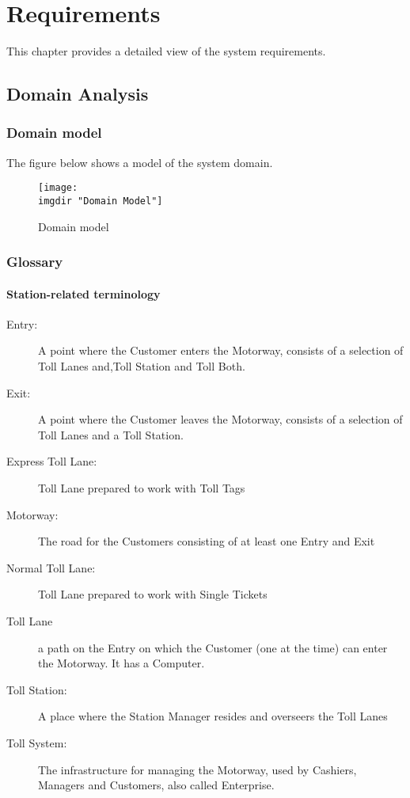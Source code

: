 \chapter{Requirements}
\noindent
This chapter provides a detailed view of the system requirements.

\section{Domain Analysis}

\subsection{Domain model}
The figure below shows a model of the system domain.
\begin{figure}[H]
\texttt{[image: \\imgdir "Domain Model"]}
\caption{Domain model}
\label{fig:domain_model}
\end{figure}

\subsection{Glossary}
\subsubsection{Station-related terminology}
\begin{description}

  \item[Entry:] A point where the Customer enters the Motorway, consists of a selection of Toll Lanes and,Toll Station and Toll Both.
  \item[Exit:] A point where the Customer leaves the Motorway, consists of a selection of Toll Lanes and a Toll Station.
  \item[Express Toll Lane:] Toll Lane prepared to work with Toll Tags
  \item[Motorway:] The road for the Customers consisting of at least one Entry and Exit
  \item[Normal Toll Lane:] Toll Lane prepared to work with Single Tickets
  \item[Toll Lane] a path on the Entry on which the Customer (one at the time) can enter the Motorway. It has a Computer.
  \item[Toll Station:] A place where the Station Manager resides and overseers the Toll Lanes
  \item[Toll System:] The infrastructure for managing the Motorway, used by Cashiers, Managers and Customers, also called Enterprise.
\end{description}
